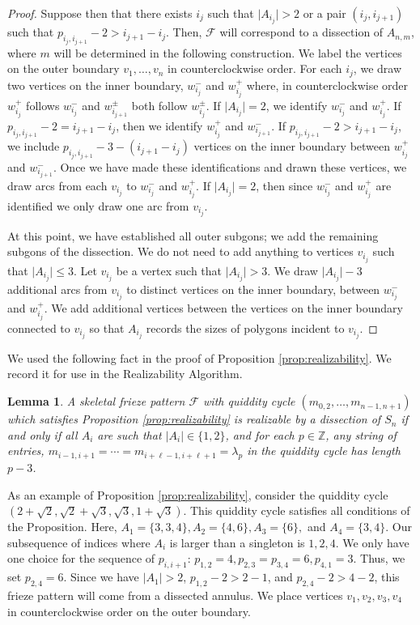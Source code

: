 \documentclass[12pt]{article}
\newtheorem{lemma}{Lemma}
\theoremstyle{remark}
\newcommand*{\F}{\mathcal{F}}
\begin{document}
\begin{proof}
Suppose then that there exists $i_j$ such that $\vert A_{i_j} \vert > 2$ or a pair $(i_j, i_{j+1})$ such that $p_{i_j,i_{j+1}} -2  > i_{j+1} - i_j$. Then, $\F$ will correspond to a dissection of $A_{n,m}$, where $m$ will be determined in the following construction. We label the vertices on the outer boundary $v_1,\ldots, v_n$ in counterclockwise order. For each $i_j$, we draw two vertices on the inner boundary, $w_{i_j}^-$ and  $w_{i_j}^+$ where, in counterclockwise order $w_{i_j}^+$ follows $w_{i_j}^-$ and $w_{i_{j+1}}^{\pm}$ both follow $w_{i_{j}}^\pm$. If $\vert A_{i_j} \vert = 2$, we identify $w_{i_j}^-$ and  $w_{i_j}^+$. If $p_{i_j,i_{j+1}} -2  = i_{j+1} - i_j$, then we identify $w_{i_j}^+ $ and $w_{i_{j+1}}^-$. If $p_{i_j,i_{j+1}} -2  > i_{j+1} - i_j$,  we include $p_{i_j,i_{j+1}} -3 -( i_{j+1} - i_j)$ vertices on the inner boundary between $w_{i_j}^+ $ and $w_{i_{j+1}}^-$. Once we have made these identifications and drawn these vertices, we draw arcs from each $v_{i_j}$ to $w_{i_j}^-$ and $w_{i_j}^+$. If $\vert A_{i_j} \vert = 2$, then since $w_{i_j}^-$ and $w_{i_j}^+$ are identified we only draw one arc from $v_{i_j}$.   

At this point, we have established all outer subgons; we add the remaining subgons of the dissection. We do not need to add anything to vertices $v_{i_j}$ such that $\vert A_{i_j} \vert \leq 3$. Let $v_{i_j}$ be a vertex such that $\vert A_{i_j} \vert > 3$. We draw $\vert A_{i_j} \vert - 3$ additional arcs from $v_{i_j}$ to distinct vertices on the inner boundary, between $w_{i_j}^-$ and $w_{i_j}^+$. We add additional vertices between the vertices on the inner boundary connected to $v_{i_j}$ so that $A_{i_j}$ records the sizes of polygons incident to $v_{i_j}$.  
\end{proof}

We used the following fact in the proof of Proposition \ref{prop:realizability}. We record it for use in the Realizability Algorithm.

\begin{lemma}\label{lem:SkeletalSn}
A skeletal frieze pattern $\F$ with quiddity cycle $(m_{0,2},\ldots,m_{n-1,n+1})$ which satisfies Proposition \ref{prop:realizability} is realizable by a dissection of $S_n$ if and only if all $A_i$ are such that $\vert A_i \vert \in \{1,2\}$, and for each $p \in \mathbb{Z}$, any string of entries, $m_{i-1,i+1} = \cdots = m_{i+\ell - 1, i+\ell+1} = \lambda_p$ in the quiddity cycle has length $p-3$. 
\end{lemma}

As an example of Proposition \ref{prop:realizability}, consider the quiddity cycle $(2+\sqrt{2}, \sqrt{2} + \sqrt{3}, \sqrt{3}, 1 + \sqrt{3})$. This quiddity cycle satisfies all conditions of the Proposition. Here, $A_1 = \{3,3,4\}, A_2 = \{4,6\}, A_3 = \{6\},$ and $A_4 = \{3,4\}$. Our subsequence of indices where $A_i$ is larger than a singleton is $1,2,4$. We only have one choice for the sequence of $p_{i,i+1}$: $p_{1,2} = 4, p_{2,3} = p_{3,4} = 6, p_{4,1} = 3$. Thus, we set $p_{2,4} = 6$. Since we have $\vert A_1 \vert > 2$, $p_{1,2} - 2 > 2 - 1$, and $p_{2,4} - 2 > 4 - 2$, this frieze pattern will come from a dissected annulus. We place vertices $v_1,v_2,v_3,v_4$ in counterclockwise order on the outer boundary. 
\end{document}
